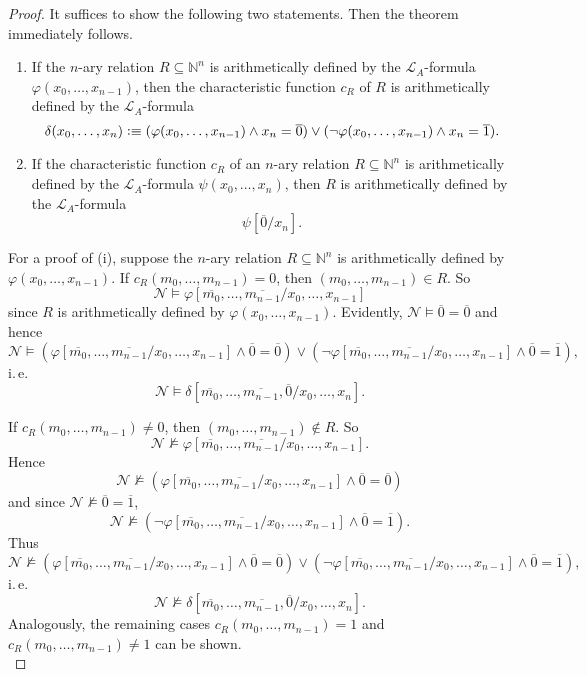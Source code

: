 \begin{proof}
It suffices to show the following two statements. Then the theorem immediately follows.
\begin{enumerate}
\item If the $n$-ary relation $R \subseteq \mathbb{N}^n$ is arithmetically defined by the $\mathcal{L}_A$-formula $\varphi(x_0, \ldots, x_{n-1})$, then the characteristic function $c_R$ of $R$ is arithmetically defined by the $\mathcal{L}_A$-formula \[\delta(x_0, \ldots, x_{n}) \vcentcolon \equiv ( \varphi(x_0, \ldots, x_{n-1}) \wedge x_{n} = \overline{0} ) \vee  ( \lnot \varphi(x_0, \ldots, x_{n-1}) \wedge x_{n}= \overline{1}) .\]
\item If the characteristic function $c_R$ of an $n$-ary relation $R\subseteq \mathbb{N}^n$ is arithmetically defined by the $\mathcal{L}_A$-formula $\psi(x_0, \ldots,x_{n})$, then $R$ is arithmetically defined by the $\mathcal{L}_A$-formula \[ \psi[\overline{0}/x_{n}]. \]  
\end{enumerate} 

For a proof of (i), suppose the $n$-ary relation $R \subseteq \mathbb{N}^n$ is arithmetically defined by $\varphi(x_0, \ldots, x_{n-1})$. If $c_R(m_0, \ldots, m_{n-1}) = 0$, then $(m_0, \ldots, m_{n-1}) \in R$. So \[\mathcal{N} \vDash \varphi[\overline{m_0}, \ldots, \overline{m_{n-1}}/x_0, \ldots, x_{n-1}] \] since $R$ is arithmetically defined by $\varphi(x_0, \ldots, x_{n-1})$. Evidently, $\mathcal{N} \vDash \overline{0} = \overline{0}$ and 
hence \[ \mathcal{N} \vDash (\varphi[\overline{m_0}, \ldots, \overline{m_{n-1}}/x_0, \ldots, x_{n-1}] \wedge \overline{0} = \overline{0}) \vee (\lnot \varphi[\overline{m_0}, \ldots, \overline{m_{n-1}}/x_0, \ldots, x_{n-1}] \wedge \overline{0} = \overline{1}), \]i.\,e.\@ 
\[ \mathcal{N} \vDash \delta[\overline{m_0}, \ldots, \overline{m_{n-1}}, \overline{0}/x_0, \ldots, x_n]. \]

If $c_R(m_0, \ldots, m_{n-1}) \neq 0$, then $(m_0, \ldots, m_{n-1}) \notin R$. So \[\mathcal{N} \nvDash  \varphi[\overline{m_0}, \ldots, \overline{m_{n-1}}/x_0, \ldots, x_{n-1}]. \] Hence \[\mathcal{N} \nvDash (\varphi[\overline{m_0}, \ldots, \overline{m_{n-1}}/x_0, \ldots, x_{n-1}] \wedge \overline{0} = \overline{0} )\] and since $\mathcal{N} \nvDash \overline{0} = \overline{1}$, \[ \mathcal{N} \nvDash (\lnot \varphi[\overline{m_0}, \ldots, \overline{m_{n-1}}/x_0, \ldots, x_{n-1}] \wedge \overline{0} = \overline{1}). \] Thus \[\mathcal{N} \nvDash  (\varphi[\overline{m_0}, \ldots, \overline{m_{n-1}}/x_0, \ldots, x_{n-1}] \wedge \overline{0} = \overline{0}) \vee (\lnot \varphi[\overline{m_0}, \ldots, \overline{m_{n-1}}/x_0, \ldots, x_{n-1}] \wedge \overline{0} = \overline{1}),\]
i.\,e.\@ 
\[ \mathcal{N} \nvDash \delta[\overline{m_0}, \ldots, \overline{m_{n-1}}, \overline{0}/x_0, \ldots, x_n]. \]
Analogously, the remaining cases $c_R(m_0, \ldots, m_{n-1}) = 1$ and $c_R(m_0, \ldots, m_{n-1}) \neq 1$ can be shown.
\\


\end{proof}

